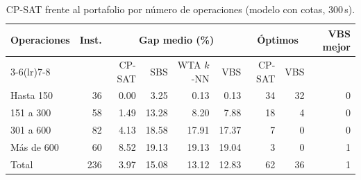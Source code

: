 \begin{table}[H]
  \centering
  \small
  \singlespacing
  \caption{CP-SAT frente al portafolio por número de operaciones (modelo con cotas, 300\,s).}
  \label{tab:cpsat}
  \begin{tabular}{lrrrrrrrr}
    \toprule
    Operaciones & Inst. & \multicolumn{4}{c}{Gap medio (\%)} & \multicolumn{2}{c}{Óptimos} & VBS mejor \\
    \cmidrule(lr){3-6}\cmidrule(lr){7-8}
     &  & CP-SAT & SBS & WTA $k$-NN & VBS & CP-SAT & VBS &  \\
    \midrule
    Hasta 150 & 36 & 0.00 & 3.25 & 0.13 & 0.13 & 34 & 32 & 0 \\
    151 a 300 & 58 & 1.49 & 13.28 & 8.20 & 7.88 & 18 & 4 & 0 \\
    301 a 600 & 82 & 4.13 & 18.58 & 17.91 & 17.37 & 7 & 0 & 0 \\
    Más de 600 & 60 & 8.52 & 19.13 & 19.13 & 19.04 & 3 & 0 & 1 \\
    \midrule
    Total & 236 & 3.97 & 15.08 & 13.12 & 12.83 & 62 & 36 & 1 \\
    \bottomrule
  \end{tabular}
  \par{}
\end{table}
